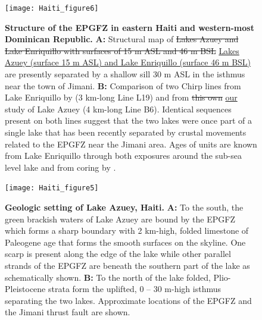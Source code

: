 \documentclass[linenumbers,draft]{agujournal}
\providecommand{\DIFdel}[1]{{\protect\color{red}\sout{#1}}}                      %
\providecommand{\DIFdelFL}[1]{\DIFdel{#1}} %
\providecommand{\DIFaddbeginFL}{} %
\providecommand{\DIFaddendFL}{} %
\providecommand{\DIFdelbeginFL}{} %
\providecommand{\DIFdelendFL}{} %
\begin{document}
\begin{figure}
\centering
\texttt{[image: Haiti\_figure6]}
\caption{\textbf{Structure of the EPGFZ in eastern Haiti and western-most Dominican Republic.} \textbf{A:} Structural map of \DIFdelbeginFL \DIFdelFL{Lakes Azuey and Lake Enriquillo with surfaces of 15 m ASL and 46 m BSL }\DIFdelendFL \DIFaddbeginFL \ul{Lakes Azuey (surface 15 m ASL) and Lake Enriquillo (surface 46 m BSL)} \DIFaddendFL are presently separated by a shallow sill 30 m ASL in the isthmus near the town of Jimani. \textbf{B:} Comparison of two Chirp lines from Lake Enriquillo by \citet{rios2013holocene} (3 km-long Line L19) and from \DIFdelbeginFL \DIFdelFL{this own }\DIFdelendFL \DIFaddbeginFL \ul{our} \DIFaddendFL study of Lake Azuey (4 km-long Line B6). Identical sequences present on both lines suggest that the two lakes were once part of a single lake that has been recently separated by crustal movements related to the EPGFZ near the Jimani area. Ages of units are known from Lake Enriquillo through both exposures around the sub-sea level lake and from coring by \citet{rios2013holocene}.}
\label{figure4}
\end{figure}

\begin{figure}
\centering
\texttt{[image: Haiti\_figure5]}
\caption{\textbf{Geologic setting of Lake Azuey, Haiti.} \textbf{A:} To the south, the green brackish waters of Lake Azuey are bound by the EPGFZ which forms a sharp boundary with 2 km-high, folded limestone of Paleogene age that forms the smooth surfaces on the skyline. One scarp is present along the edge of the lake while other parallel strands of the EPGFZ are beneath the southern part of the lake as schematically shown. \textbf{B:} To the north of the lake folded, Plio-Pleistocene strata form the uplifted, 0 -- 30 m-high isthmus separating the two lakes. Approximate locations of the EPGFZ and the Jimani thrust fault are shown.}
\label{figure5}
\end{figure}
\end{document}
